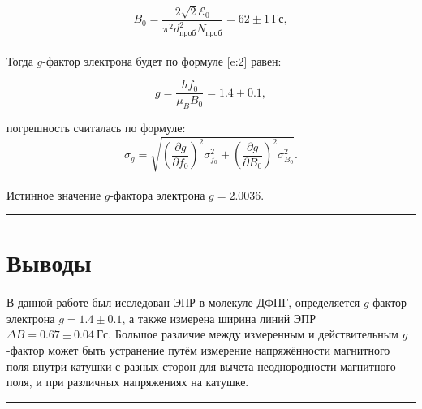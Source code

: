 \documentclass[a4paper,12pt]{article} %
\begin{document}
\[
B_0 = \dfrac{2 \sqrt{2} \mathcal{E}_0}{\pi^2 d_{\text{проб}}^2 N_{\text{проб}}} = 62 \pm 1~\text{Гс},
\]

\paragraph{} Тогда $g$-фактор электрона будет по формуле \eqref{e:2} равен:

\[
g = \dfrac{hf_0}{\mu_B B_0} = 1.4 \pm 0.1,
\]

\noindent погрешность считалась по формуле:
\[
\sigma_g = \sqrt{ \left( \dfrac{\partial g}{\partial f_0}\right)^2 \sigma_{f_0}^2 + \left( \dfrac{\partial g}{\partial B_0}\right)^2 \sigma_{B_0}^2}.
\]

\paragraph{} Истинное значение $g$-фактора электрона $g = 2.0036$.
\medskip\hrule\medskip

\section{Выводы}

\paragraph{}В данной работе был исследован ЭПР в молекуле ДФПГ, определяется $g$-фактор электрона $g = 1.4 \pm 0.1$, а также измерена ширина линий ЭПР $\Delta B = 0.67 \pm 0.04~\text{Гс}$. Большое различие между измеренным и действительным $g$-фактор может быть устранение путём измерение напряжённости магнитного поля внутри катушки с разных сторон для вычета неоднородности магнитного поля, и при различных напряжениях на катушке.


\medskip\hrule\medskip
\end{document}
